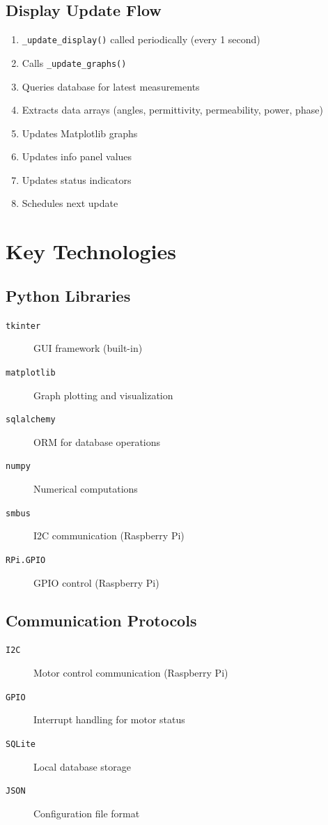 \documentclass[11pt,a4paper]{article}
\begin{document}
\subsection{Display Update Flow}
\begin{enumerate}
    \item \texttt{\_update\_display()} called periodically (every 1 second)
    \item Calls \texttt{\_update\_graphs()}
    \item Queries database for latest measurements
    \item Extracts data arrays (angles, permittivity, permeability, power, phase)
    \item Updates Matplotlib graphs
    \item Updates info panel values
    \item Updates status indicators
    \item Schedules next update
\end{enumerate}

\section{Key Technologies}

\subsection{Python Libraries}
\begin{description}
    \item[\texttt{tkinter}] GUI framework (built-in)
    \item[\texttt{matplotlib}] Graph plotting and visualization
    \item[\texttt{sqlalchemy}] ORM for database operations
    \item[\texttt{numpy}] Numerical computations
    \item[\texttt{smbus}] I2C communication (Raspberry Pi)
    \item[\texttt{RPi.GPIO}] GPIO control (Raspberry Pi)
\end{description}

\subsection{Communication Protocols}
\begin{description}
    \item[\texttt{I2C}] Motor control communication (Raspberry Pi)
    \item[\texttt{GPIO}] Interrupt handling for motor status
    \item[\texttt{SQLite}] Local database storage
    \item[\texttt{JSON}] Configuration file format
\end{description}
\end{document}
